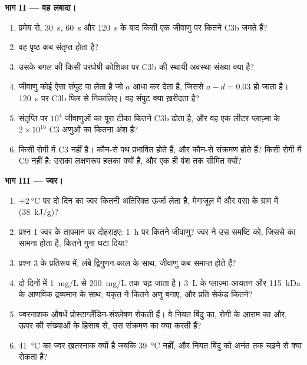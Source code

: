 \begin{problem}
\medskip
\noindent\textbf{भाग II --- वह लबादा।}
\begin{enumerate}[resume]
  \item प्रमेय से, \qty{30}{s}, \qty{60}{s} और \qty{120}{s} के बाद किसी
        एक जीवाणु पर कितने C3b जमते हैं?
  \item वह पृष्ठ कब संतृप्त होता है?
  \item उसके बगल की किसी परपोषी कोशिका पर C3b की स्थायी-अवस्था संख्या
        क्या है?
  \item जीवाणु कोई ऐसा संपुट पा लेता है जो $a$ आधा कर देता है, जिससे
        $a -
        d = 0.03$ हो जाता है। \qty{120}{s} पर C3b फिर से निकालिए।
        वह संपुट क्या ख़रीदता है?
  \item संतृप्ति पर $10^{4}$ जीवाणुओं का पूरा टीका कितने C3b ढोता है,
        और वह एक लीटर प्लाज़्मा के $2\times 10^{16}$ C3 अणुओं का कितना
        अंश है?
  \item किसी रोगी में C3 नहीं है। कौन-से पथ प्रभावित होते हैं, और कौन-से
        संक्रमण होते हैं? किसी रोगी में C9 नहीं है: उसका लक्षणरूप हलका
        क्यों है, और एक ही वंश तक सीमित क्यों?
\end{enumerate}

\medskip
\noindent\textbf{भाग III --- ज्वर।}
\begin{enumerate}[resume]
  \item $+\qty{2}{\celsius}$ पर दो दिन का ज्वर कितनी अतिरिक्त ऊर्जा
        लेता है, मेगाजूल में और वसा के ग्राम में
        (\qty{38}{kJ/g})?
  \item प्रश्न 1 ज्वर के तापमान पर दोहराइए: \qty{1}{h} पर कितने जीवाणु?
        ज्वर ने उस समष्टि को, जिससे  का सामना होता है,
        कितने गुना घटा दिया?
  \item प्रश्न 3 के प्रतिरूप में, लंबे द्विगुणन-काल के साथ, जीवाणु कब
        समाप्त होते हैं?
  \item {} दो दिनों में \qty{1}{mg/L} से
        \qty{200}{mg/L} तक चढ़ जाता है। \qty{3}{L} के प्लाज़्मा-आयतन और
        \qty{115}{kDa} के आणविक द्रव्यमान के साथ, यकृत ने कितने अणु
        बनाए, और प्रति सेकंड कितने?
  \item ज्वरनाशक औषधें प्रोस्टाग्लैंडिन-संश्लेषण रोकती हैं। वे नियत
        बिंदु का, रोगी के आराम का और, ऊपर की संख्याओं के हिसाब से, उस
        संक्रमण का क्या करती हैं?
  \item \qty{41}{\celsius} का ज्वर ख़तरनाक क्यों है जबकि
        \qty{39}{\celsius} नहीं, और नियत बिंदु को अनंत तक चढ़ने से क्या
        रोकता है?
\end{enumerate}


\end{problem}
